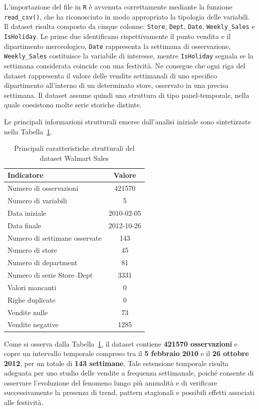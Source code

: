 \documentclass[a4paper,12pt]{article}
\begin{document}
L’importazione del file in \texttt{R} è avvenuta correttamente mediante la funzione \texttt{read\_csv()}, che ha riconosciuto in modo appropriato la tipologia delle variabili. Il dataset risulta composto da cinque colonne: \texttt{Store}, \texttt{Dept}, \texttt{Date}, \texttt{Weekly\_Sales} e \texttt{IsHoliday}. Le prime due identificano rispettivamente il punto vendita e il dipartimento merceologico, \texttt{Date} rappresenta la settimana di osservazione, \texttt{Weekly\_Sales} costituisce la variabile di interesse, mentre \texttt{IsHoliday} segnala se la settimana considerata coincide con una festività. Ne consegue che ogni riga del dataset rappresenta il valore delle vendite settimanali di uno specifico dipartimento all’interno di un determinato store, osservato in una precisa settimana. Il dataset assume quindi una struttura di tipo panel-temporale, nella quale coesistono molte serie storiche distinte.

Le principali informazioni strutturali emerse dall’analisi iniziale sono sintetizzate nella Tabella~\ref{tab:struttura_dataset}.

\begin{table}[H]
\centering
\caption{Principali caratteristiche strutturali del dataset Walmart Sales}
\label{tab:struttura_dataset}
\begin{tabular}{lc}
\toprule
\textbf{Indicatore} & \textbf{Valore} \\
\midrule
Numero di osservazioni & 421570 \\
Numero di variabili & 5 \\
Data iniziale & 2010-02-05 \\
Data finale & 2012-10-26 \\
Numero di settimane osservate & 143 \\
Numero di store & 45 \\
Numero di department & 81 \\
Numero di serie Store--Dept & 3331 \\
Valori mancanti & 0 \\
Righe duplicate & 0 \\
Vendite nulle & 73 \\
Vendite negative & 1285 \\
\bottomrule
\end{tabular}
\end{table}

Come si osserva dalla Tabella~\ref{tab:struttura_dataset}, il dataset contiene \textbf{421570 osservazioni} e copre un intervallo temporale compreso tra il \textbf{5 febbraio 2010} e il \textbf{26 ottobre 2012}, per un totale di \textbf{143 settimane}. Tale estensione temporale risulta adeguata per uno studio delle vendite a frequenza settimanale, poiché consente di osservare l’evoluzione del fenomeno lungo più annualità e di verificare successivamente la presenza di trend, pattern stagionali e possibili effetti associati alle festività.
\end{document}
